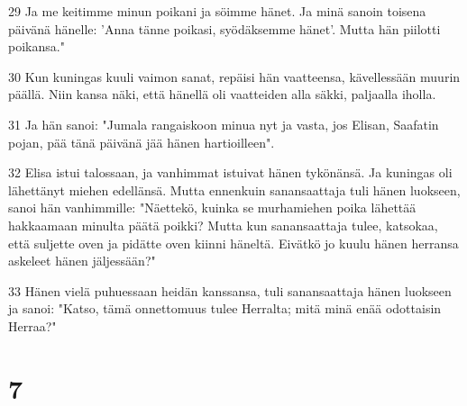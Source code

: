 \par 29 Ja me keitimme minun poikani ja söimme hänet. Ja minä sanoin toisena päivänä hänelle: 'Anna tänne poikasi, syödäksemme hänet'. Mutta hän piilotti poikansa."
\par 30 Kun kuningas kuuli vaimon sanat, repäisi hän vaatteensa, kävellessään muurin päällä. Niin kansa näki, että hänellä oli vaatteiden alla säkki, paljaalla iholla.
\par 31 Ja hän sanoi: "Jumala rangaiskoon minua nyt ja vasta, jos Elisan, Saafatin pojan, pää tänä päivänä jää hänen hartioilleen".
\par 32 Elisa istui talossaan, ja vanhimmat istuivat hänen tykönänsä. Ja kuningas oli lähettänyt miehen edellänsä. Mutta ennenkuin sanansaattaja tuli hänen luokseen, sanoi hän vanhimmille: "Näettekö, kuinka se murhamiehen poika lähettää hakkaamaan minulta päätä poikki? Mutta kun sanansaattaja tulee, katsokaa, että suljette oven ja pidätte oven kiinni häneltä. Eivätkö jo kuulu hänen herransa askeleet hänen jäljessään?"
\par 33 Hänen vielä puhuessaan heidän kanssansa, tuli sanansaattaja hänen luokseen ja sanoi: "Katso, tämä onnettomuus tulee Herralta; mitä minä enää odottaisin Herraa?"

\chapter{7}

